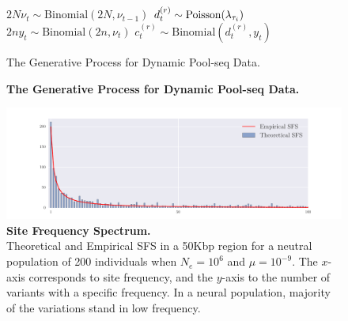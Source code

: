 \begin{figure}[H]
 \begin{algorithm}[H]
 	\DontPrintSemicolon
 	\SetAlgoNoLine
 	{
 		{
 			$2N\nu_t \sim \text{Binomial}({2N},{\nu_{t-1}})$\;
 			{
 				$d^{(r)}_{t} \sim \operatorname{Poisson}(\lambda_{\tau_i})$ \;
 				$2ny_t \sim \text{Binomial}({2n},{\nu_{t}})$\;  
 				$c^{(r)}_{t} \sim \text{Binomial}(d^{(r)}_{t},{y_{t}})$\; 
 			}
 		}
 	}
 	\caption{The Generative Process for Dynamic Pool-seq Data.} 
 \end{algorithm}
 \caption{{\bf The Generative Process for Dynamic Pool-seq Data.}}
  	\label{proc:arya}
\end{figure}	
\begin{figure}[H]
	\centering
	\includegraphics[trim=.01in 0.1in .01in 
	0.1in,clip,width=\textwidth]{sfs.pdf}
	\caption{{\bf Site Frequency Spectrum.}\\ Theoretical and
          Empirical SFS in a 50Kbp region for a neutral population of 200
          individuals when $N_e=10^6$ and $\mu=10^{-9}$. The $x$-axis 
          corresponds to site frequency, and
          the $y$-axis to the number of variants with a specific
          frequency. 
          In a neural population, majority of the variations stand in low 
          frequency.} \label{fig:sfs}
\end{figure}

